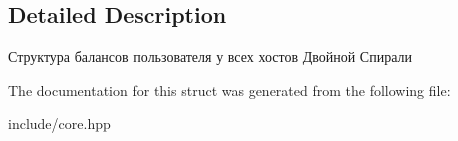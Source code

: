 \subsection{Detailed Description}
Структура балансов пользователя у всех хостов Двойной Спирали 

The documentation for this struct was generated from the following file\+:\begin{DoxyCompactItemize}
\item 
include/core.\+hpp\end{DoxyCompactItemize}
